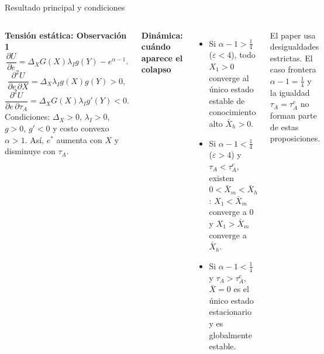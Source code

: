 \documentclas\documentclass[aspectratio=169,11pt]{beamer}
\newcommand{\azul}[1]{\textcolor{AzulMedio}{\textbf{#1}}}
\begin{document}
\begin{frame}{Resultado principal y condiciones}
\begin{columns}[T,onlytextwidth]
\azul{Tensión estática: Observación 1}
\[
\frac{\partial U}{\partial e}
=\Delta_XG(X)\lambda_I g(Y)-e^{\alpha-1}.
\]
\[
\frac{\partial^2U}{\partial e\,\partial X}
=\Delta_X\lambda_I g(X)g(Y)>0,
\]
\[
\frac{\partial^2U}{\partial e\,\partial\tau_A}
=\Delta_XG(X)\lambda_I g'(Y)<0.
\]
{\small Condiciones: $\Delta_X>0$, $\lambda_I>0$, $g>0$, $g'<0$ y costo convexo $\alpha>1$. Así, $e^*$ aumenta con $X$ y disminuye con $\tau_A$.}

\azul{Dinámica: cuándo aparece el colapso}
\begin{itemize}\small
  \item Si $\alpha-1>\tfrac14$ ($\varepsilon<4$), todo $X_1>0$ converge al único estado estable de conocimiento alto $\bar X_h>0$.
  \item Si $\alpha-1<\tfrac14$ ($\varepsilon>4$) y $\tau_A<\tau_A^c$, existen $0<\bar X_m<\bar X_h$: $X_1<\bar X_m$ converge a $0$ y $X_1>\bar X_m$ converge a $\bar X_h$.
  \item Si $\alpha-1<\tfrac14$ y $\tau_A>\tau_A^c$, $\bar X=0$ es el único estado estacionario y es globalmente estable.
\end{itemize}
\vspace{0.08cm}
{\footnotesize\color{Gris}El paper usa desigualdades estrictas. El caso frontera $\alpha-1=\tfrac14$ y la igualdad $\tau_A=\tau_A^c$ no forman parte de estas proposiciones.}
\end{columns}
\end{frame}
\end{document}
